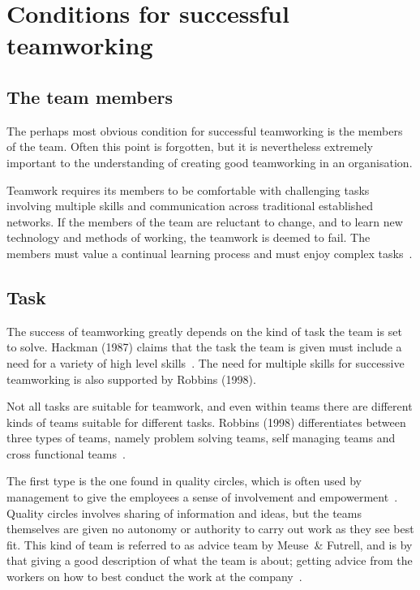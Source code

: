 \documentclass[a4paper,12pt,titlepage]{article}
\begin{document}
  \section{Conditions for successful teamworking}
  \subsection{The team members }
  The perhaps most obvious condition for successful teamworking
  is the members of the team. Often this point is forgotten, but
  it is nevertheless extremely important to the understanding
  of creating good teamworking in an organisation.

  Teamwork requires its members to be comfortable with
  challenging tasks involving multiple skills and communication
  across traditional established networks. If the members of the
  team are reluctant to change, and to learn new technology
  and methods of working, the teamwork is deemed to fail.
  The members must value a continual learning process and
  must enjoy complex tasks~\cite[303]{sr}.

  \subsection{Task}
  The success of teamworking greatly depends on the kind
  of task the team is set to solve. Hackman (1987) claims that
  the task the team is given must include a need for a variety
  of high level skills~\cite[375]{ahdb}. The need for multiple
  skills for successive teamworking is also supported by
  Robbins (1998).

  Not all tasks are suitable
  for teamwork, and even within teams there are different kinds of
  teams suitable for different tasks. Robbins (1998) differentiates
  between three types of teams, namely problem solving teams, self
  managing teams and cross functional teams~\cite[287]{sr}.

  The first type is the one found in quality circles, which
  is often used by management to give the employees a sense
  of involvement and empowerment~\cite[88-9]{jhbm}.
  Quality circles involves sharing of information and ideas, but
  the teams themselves are given no autonomy or authority to
  carry out work as they see best fit. This kind of team
  is referred to as advice team by Meuse~\& Futrell,
  and is by that giving a good description of what the
  team is about; getting advice from the workers on how
  to best conduct the work at the company~\cite[378-80]{ahdb}.
\end{document}

